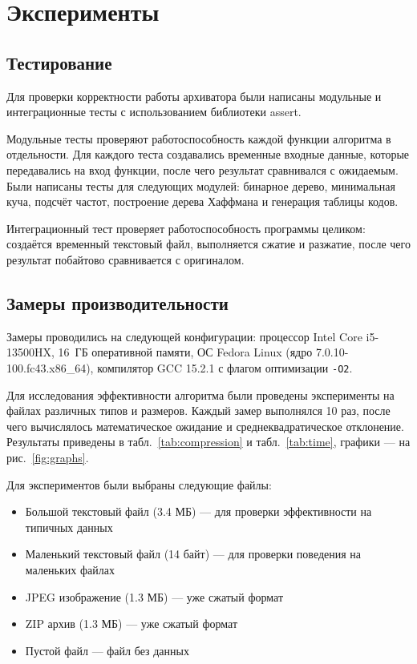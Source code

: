 \documentclass[a4paper]{article}
\begin{document}
\section{Эксперименты}

\subsection*{Тестирование}

Для проверки корректности работы архиватора были написаны модульные и интеграционные тесты с использованием библиотеки assert. 

Модульные тесты проверяют работоспособность каждой функции алгоритма в отдельности. Для каждого теста создавались временные входные данные, которые передавались на вход функции, после чего результат сравнивался с ожидаемым. Были написаны тесты для следующих модулей: бинарное дерево, минимальная куча, подсчёт частот, построение дерева Хаффмана и генерация таблицы кодов.

Интеграционный тест проверяет работоспособность программы целиком: создаётся временный текстовый файл, выполняется сжатие и разжатие, после чего результат побайтово сравнивается с оригиналом.

\subsection*{Замеры производительности}

Замеры проводились на следующей конфигурации: процессор Intel Core i5-13500HX, 16~ГБ оперативной памяти, ОС Fedora Linux (ядро 7.0.10-100.fc43.x86\_64), компилятор GCC 15.2.1 с флагом оптимизации \texttt{-O2}.

Для исследования эффективности алгоритма были проведены эксперименты на файлах различных типов и размеров. Каждый замер выполнялся 10 раз, после чего вычислялось математическое ожидание и среднеквадратическое отклонение. Результаты приведены в табл.~\ref{tab:compression} и табл.~\ref{tab:time}, графики --- на рис.~\ref{fig:graphs}.

Для экспериментов были выбраны следующие файлы:
\begin{itemize}
    \item Большой текстовый файл (3.4 МБ) --- для проверки эффективности на типичных данных
    \item Маленький текстовый файл (14 байт) --- для проверки поведения на маленьких файлах
    \item JPEG изображение (1.3 МБ) --- уже сжатый формат
    \item ZIP архив (1.3 МБ) --- уже сжатый формат
    \item Пустой файл --- файл без данных
\end{itemize}
\end{document}
